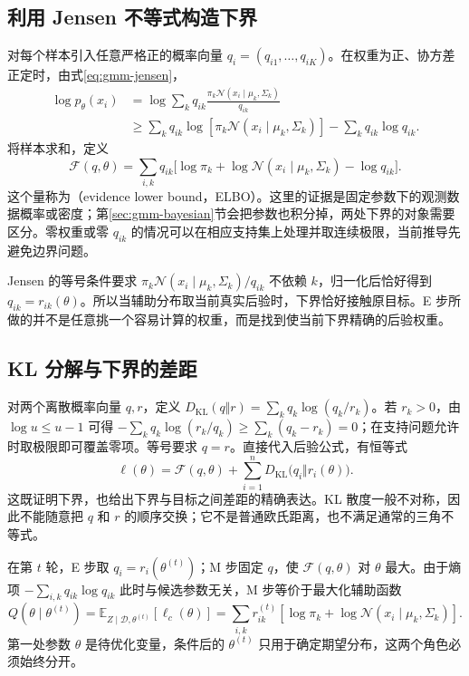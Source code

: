 \documentclass[UTF8]{ctexart}
\begin{document}
\subsection{利用 Jensen 不等式构造下界}
对每个样本引入任意严格正的概率向量 $q_i=(q_{i1},\ldots,q_{iK})$。在权重为正、协方差正定时，由式\eqref{eq:gmm-jensen}，
\begin{align}
\log p_\theta(x_i)
&=\log\sum_kq_{ik}\frac{\pi_k\mathcal N(x_i\mid\mu_k,\Sigma_k)}{q_{ik}}\nonumber\\
&\geq\sum_kq_{ik}\log[\pi_k\mathcal N(x_i\mid\mu_k,\Sigma_k)]
-\sum_kq_{ik}\log q_{ik}.\label{eq:gmm-elbo-point}
\end{align}
将样本求和，定义
\begin{equation}
\mathcal F(q,\theta)=\sum_{i,k}q_{ik}\bigl[\log\pi_k+
\log\mathcal N(x_i\mid\mu_k,\Sigma_k)-\log q_{ik}\bigr].
\label{eq:gmm-elbo}
\end{equation}
这个量称为（evidence lower bound，ELBO）。这里的证据是固定参数下的观测数据概率或密度；第\ref{sec:gmm-bayesian}节会把参数也积分掉，两处下界的对象需要区分。零权重或零 $q_{ik}$ 的情况可以在相应支持集上处理并取连续极限，当前推导先避免边界问题。

Jensen 的等号条件要求 $\pi_k\mathcal N(x_i\mid\mu_k,\Sigma_k)/q_{ik}$ 不依赖 $k$，归一化后恰好得到 $q_{ik}=r_{ik}(\theta)$。所以当辅助分布取当前真实后验时，下界恰好接触原目标。E 步所做的并不是任意挑一个容易计算的权重，而是找到使当前下界精确的后验权重。

\subsection{KL 分解与下界的差距}
对两个离散概率向量 $q,r$，定义 $D_{\mathrm{KL}}(q\Vert r)=\sum_kq_k\log(q_k/r_k)$。若 $r_k>0$，由 $\log u\leq u-1$ 可得
$-\sum_kq_k\log(r_k/q_k)\geq\sum_k(q_k-r_k)=0$；在支持问题允许时取极限即可覆盖零项。等号要求 $q=r$。直接代入后验公式，有恒等式
\begin{equation}
\ell(\theta)=\mathcal F(q,\theta)+\sum_{i=1}^nD_{\mathrm{KL}}\bigl(q_i\Vert r_i(\theta)\bigr).
\label{eq:gmm-kl-decomposition}
\end{equation}
这既证明下界，也给出下界与目标之间差距的精确表达。KL 散度一般不对称，因此不能随意把 $q$ 和 $r$ 的顺序交换；它不是普通欧氏距离，也不满足通常的三角不等式。

在第 $t$ 轮，E 步取 $q_i=r_i(\theta^{(t)})$；M 步固定 $q$，使 $\mathcal F(q,\theta)$ 对 $\theta$ 最大。由于熵项 $-\sum_{i,k}q_{ik}\log q_{ik}$ 此时与候选参数无关，M 步等价于最大化辅助函数
\begin{equation}
Q(\theta\mid\theta^{(t)})=
\mathbb E_{Z\mid\mathcal D,\theta^{(t)}}[\ell_c(\theta)]
=\sum_{i,k}r_{ik}^{(t)}[\log\pi_k+\log\mathcal N(x_i\mid\mu_k,\Sigma_k)].
\label{eq:gmm-q-function}
\end{equation}
第一处参数 $\theta$ 是待优化变量，条件后的 $\theta^{(t)}$ 只用于确定期望分布，这两个角色必须始终分开。
\end{document}
